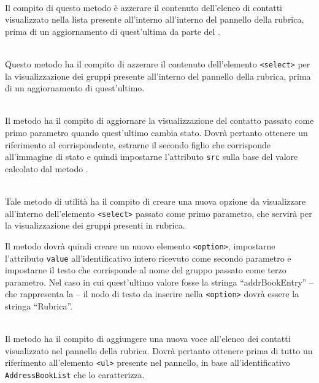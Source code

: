 \begin{description}
\item{}\\
Il compito di questo metodo è azzerare il contenuto dell'elenco di contatti visualizzato nella lista presente all'interno all'interno del pannello della rubrica, prima di un aggiornamento di quest'ultima da parte del .

\item{}\\
Questo metodo ha il compito di azzerare il contenuto dell'elemento \verb'<select>' per la visualizzazione dei gruppi presente all'interno del pannello della rubrica, prima di un aggiornamento di quest'ultimo.

\item{}\\
Il metodo ha il compito di aggiornare la visualizzazione del contatto passato come primo parametro quando quest'ultimo cambia stato. Dovrà pertanto ottenere un riferimento al  corrispondente, estrarne il secondo figlio che corrisponde all'immagine di stato e quindi impostarne l'attributo \verb'src' sulla base del valore calcolato dal metodo .

\item{}\\
Tale metodo di utilità ha il compito di creare una nuova opzione da visualizzare all'interno dell'elemento \verb'<select>' passato come primo parametro, che servirà per la visualizzazione dei gruppi presenti in rubrica.

Il metodo dovrà quindi creare un nuovo elemento \verb'<option>', impostarne l'attributo \verb'value' all'identificativo intero ricevuto come secondo parametro e impostarne il testo che corrisponde al nome del gruppo passato come terzo parametro. Nel caso in cui quest'ultimo valore fosse la stringa ``addrBookEntry'' -- che rappresenta la  -- il nodo di testo da inserire nella \verb'<option>' dovrà essere la stringa ``Rubrica''.

\item{}\\
Il metodo ha il compito di aggiungere una nuova voce all'elenco dei contatti visualizzato nel pannello della rubrica. Dovrà pertanto ottenere prima di tutto un riferimento all'elemento \verb'<ul>' presente nel pannello, in base all'identificativo \verb'AddressBookList' che lo caratterizza.


\end{description}
